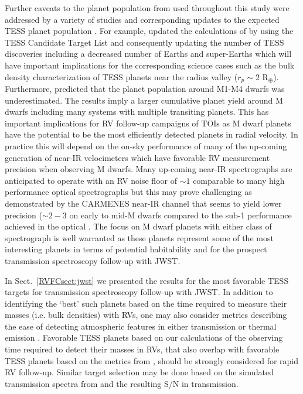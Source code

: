 Further caveats to the planet population from  used throughout this study were
addressed by a variety of studies and corresponding updates to the expected TESS planet population
\citep[e.g.][]{ballard18,barclay18}. 
For example, \cite{barclay18} updated
the calculations of  by using the TESS Candidate Target List \citep{stassun17}
and consequently updating the number of TESS discoveries including a decreased number of Earths and
super-Earths which will have important implications for the corresponding science cases such as
the bulk density characterization of TESS planets near the radius valley ($r_p \sim 2$ R$_{\oplus}$).
Furthermore, \cite{ballard18} predicted that the planet population around M1-M4 dwarfs was
underestimated. The results imply a larger cumulative planet yield around M dwarfs including many
systems with multiple transiting planets. This has important implications for RV follow-up campaigns
of TOIs as M dwarf planets have the potential to be the most efficiently detected planets in radial velocity.
In practice this will depend on the on-sky performance of many of the up-coming generation of near-IR
velocimeters which have favorable RV measurement precision when observing M dwarfs.
Many up-coming near-IR spectrographs are anticipated to operate with an RV noise floor of $\sim 1$
\mps{} comparable to many high performance optical spectrographs but this may prove
challenging as demonstrated by the CARMENES near-IR channel that seems to yield lower precision
($\sim 2-3$ \mps{)} on early to mid-M dwarfs compared to the sub-1 \mps{} performance achieved in the
optical \citep[][c.f. Fig 6]{reiners18}.
The focus on M dwarf planets with either class of spectrograph is well warranted as these planets
represent some of the most interesting planets in terms of potential habitability and for the
prospect transmission spectroscopy follow-up with JWST.

In Sect.~\ref{RVFCsect:jwst} we presented the results for the most favorable TESS targets for
transmission spectroscopy follow-up with JWST. In addition to identifying the `best' such planets
based on the time required to measure their masses (i.e. bulk densities) with RVs,
one may also consider metrics
describing the ease of detecting atmospheric features in either transmission or thermal emission
\citep[e.g.][]{kempton18,morgan18}. Favorable TESS planets based on our calculations of
the observing time required to detect their masses in RVs, that also overlap with favorable TESS planets
based on the metrics from \cite{kempton18}, should be strongly considered for rapid RV follow-up.
Similar target selection may be done based on the simulated transmission spectra from \cite{louie18}
and the resulting S/N in transmission.

